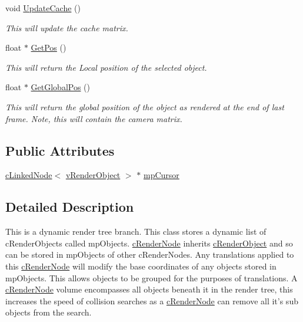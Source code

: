 \begin{DoxyCompactItemize}
void \hyperlink{classc_render_node_ad007ec73538353c0bc86a9629abdaaa4}{UpdateCache} ()
\begin{DoxyCompactList}\small\item\em This will update the cache matrix. \item\end{DoxyCompactList}\item 
float $\ast$ \hyperlink{classc_render_node_a456e5433b5fd3601d4392dd92de1fd31}{GetPos} ()
\begin{DoxyCompactList}\small\item\em This will return the Local position of the selected object. \item\end{DoxyCompactList}\item 
float $\ast$ \hyperlink{classc_render_node_ac4c1e605f4b0acc4b4efcbc4447ff143}{GetGlobalPos} ()
\begin{DoxyCompactList}\small\item\em This will return the global position of the object as rendered at the end of last frame. Note, this will contain the camera matrix. \item\end{DoxyCompactList}\end{DoxyCompactItemize}
\subsection*{Public Attributes}
\begin{DoxyCompactItemize}
\item 
\hyperlink{classc_linked_node}{cLinkedNode}$<$ \hyperlink{classv_render_object}{vRenderObject} $>$ $\ast$ \hyperlink{classc_render_node_a753eafd93821f67b86ee8f4642053f2d}{mpCursor}
\end{DoxyCompactItemize}


\subsection{Detailed Description}
This is a dynamic render tree branch. This class stores a dynamic list of cRenderObjects called mpObjects. \hyperlink{classc_render_node}{cRenderNode} inherits \hyperlink{classc_render_object}{cRenderObject} and so can be stored in mpObjects of other cRenderNodes. Any translations applied to this \hyperlink{classc_render_node}{cRenderNode} will modify the base coordinates of any objects stored in mpObjects. This allows objects to be grouped for the purposes of translations. A \hyperlink{classc_render_node}{cRenderNode} volume encompasses all objects beneath it in the render tree, this increases the speed of collision searches as a \hyperlink{classc_render_node}{cRenderNode} can remove all it's sub objects from the search. 

